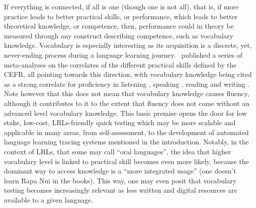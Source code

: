 If everything is connected, if all is one (though one is not all), that is, if more practice leads to better practical skills, or performance, which leads to better theoretical knowledge, or competence, then, performance could in theory be measured through any construct describing competence, such as vocabulary knowledge. Vocabulary is especially interesting as its acquisition is a discrete, yet, never-ending process during a language learning journey.\ \textcite{eun_hee_jeon_understanding_2022} published a series of meta-analyses on the correlates of the different practical skills defined by the CEFR, all pointing towards this direction, with vocabulary knowledge being cited as a strong correlate for proficiency in listening \parencite{innami_meta-analysis_2022}, speaking \parencite{jeon_meta-analysis_2022}, reading \parencite{jeon_updated_2022} and writing \parencite{kojima_meta-analysis_2022}. Note however that this does not mean that vocabulary knowledge causes fluency, although it contributes to it to the extent that fluency does not come without an advanced level vocabulary knowledge. This basic premise opens the door for low stake, low-cost, LRLs-friendly quick testing which may be more scalable and applicable in many areas, from self-assessment, to the development of automated language learning tracing systems mentioned in the introduction. Notably, in the context of LRLs, that some may call ``oral languages'', the idea that higher vocabulary level is linked to practical skill becomes even more likely, because the dominant way to access knowledge is a ``more integrated usage'' (one doesn't learn Rapa Nui in the books). This way, one may even posit that vocabulary testing becomes increasingly relevant as less written and digital resources are available to a given language. 

